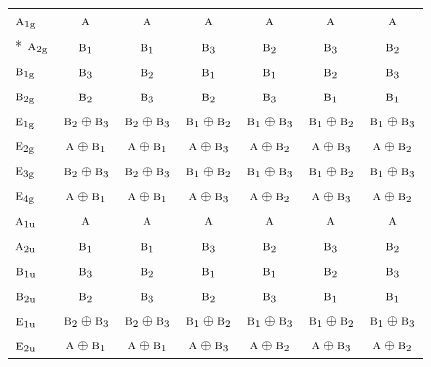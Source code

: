 \documentclass[10pt,a4paper]{article}
\numberwithin{equation}{section}
\newcommand{\irr}[1]{\text{\normalfont\scshape #1}}
\newcommand{\ptag}[1]{\mathrm{#1}}
\begin{document}
{\begin{longtable}{@{}lcccccc@{}}
\bottomrule\endfoot\endlastfoot
$\irr{a}_{1\ptag{g}}$ & $\irr{a}$ & $\irr{a}$ & $\irr{a}$ & $\irr{a}$ & $\irr{a}$ & $\irr{a}$\\*
$\irr{a}_{2\ptag{g}}$ & $\irr{b}_{1}$ & $\irr{b}_{1}$ & $\irr{b}_{3}$ & $\irr{b}_{2}$ & $\irr{b}_{3}$ & $\irr{b}_{2}$\\
$\irr{b}_{1\ptag{g}}$ & $\irr{b}_{3}$ & $\irr{b}_{2}$ & $\irr{b}_{1}$ & $\irr{b}_{1}$ & $\irr{b}_{2}$ & $\irr{b}_{3}$\\
$\irr{b}_{2\ptag{g}}$ & $\irr{b}_{2}$ & $\irr{b}_{3}$ & $\irr{b}_{2}$ & $\irr{b}_{3}$ & $\irr{b}_{1}$ & $\irr{b}_{1}$\\
$\irr{e}_{1\ptag{g}}$ & $\irr{b}_{2}\oplus \irr{b}_{3}$ & $\irr{b}_{2}\oplus \irr{b}_{3}$ & $\irr{b}_{1}\oplus \irr{b}_{2}$ & $\irr{b}_{1}\oplus \irr{b}_{3}$ & $\irr{b}_{1}\oplus \irr{b}_{2}$ & $\irr{b}_{1}\oplus \irr{b}_{3}$\\
$\irr{e}_{2\ptag{g}}$ & $\irr{a}\oplus \irr{b}_{1}$ & $\irr{a}\oplus \irr{b}_{1}$ & $\irr{a}\oplus \irr{b}_{3}$ & $\irr{a}\oplus \irr{b}_{2}$ & $\irr{a}\oplus \irr{b}_{3}$ & $\irr{a}\oplus \irr{b}_{2}$\\
$\irr{e}_{3\ptag{g}}$ & $\irr{b}_{2}\oplus \irr{b}_{3}$ & $\irr{b}_{2}\oplus \irr{b}_{3}$ & $\irr{b}_{1}\oplus \irr{b}_{2}$ & $\irr{b}_{1}\oplus \irr{b}_{3}$ & $\irr{b}_{1}\oplus \irr{b}_{2}$ & $\irr{b}_{1}\oplus \irr{b}_{3}$\\
$\irr{e}_{4\ptag{g}}$ & $\irr{a}\oplus \irr{b}_{1}$ & $\irr{a}\oplus \irr{b}_{1}$ & $\irr{a}\oplus \irr{b}_{3}$ & $\irr{a}\oplus \irr{b}_{2}$ & $\irr{a}\oplus \irr{b}_{3}$ & $\irr{a}\oplus \irr{b}_{2}$\\
$\irr{a}_{1\ptag{u}}$ & $\irr{a}$ & $\irr{a}$ & $\irr{a}$ & $\irr{a}$ & $\irr{a}$ & $\irr{a}$\\
$\irr{a}_{2\ptag{u}}$ & $\irr{b}_{1}$ & $\irr{b}_{1}$ & $\irr{b}_{3}$ & $\irr{b}_{2}$ & $\irr{b}_{3}$ & $\irr{b}_{2}$\\
$\irr{b}_{1\ptag{u}}$ & $\irr{b}_{3}$ & $\irr{b}_{2}$ & $\irr{b}_{1}$ & $\irr{b}_{1}$ & $\irr{b}_{2}$ & $\irr{b}_{3}$\\
$\irr{b}_{2\ptag{u}}$ & $\irr{b}_{2}$ & $\irr{b}_{3}$ & $\irr{b}_{2}$ & $\irr{b}_{3}$ & $\irr{b}_{1}$ & $\irr{b}_{1}$\\
$\irr{e}_{1\ptag{u}}$ & $\irr{b}_{2}\oplus \irr{b}_{3}$ & $\irr{b}_{2}\oplus \irr{b}_{3}$ & $\irr{b}_{1}\oplus \irr{b}_{2}$ & $\irr{b}_{1}\oplus \irr{b}_{3}$ & $\irr{b}_{1}\oplus \irr{b}_{2}$ & $\irr{b}_{1}\oplus \irr{b}_{3}$\\
$\irr{e}_{2\ptag{u}}$ & $\irr{a}\oplus \irr{b}_{1}$ & $\irr{a}\oplus \irr{b}_{1}$ & $\irr{a}\oplus \irr{b}_{3}$ & $\irr{a}\oplus \irr{b}_{2}$ & $\irr{a}\oplus \irr{b}_{3}$ & $\irr{a}\oplus \irr{b}_{2}$\\

\end{longtable}}
\end{document}
